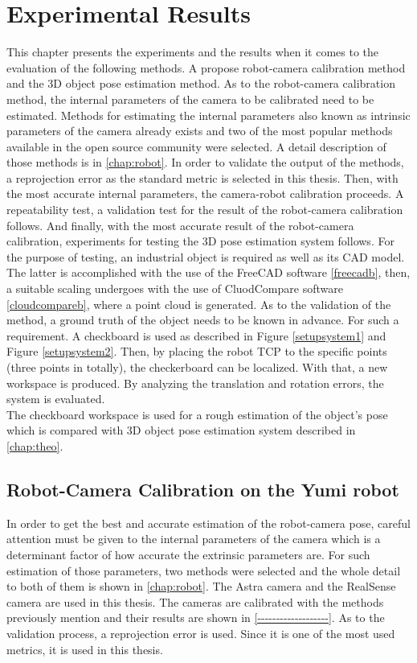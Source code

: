
\chapter{Experimental Results}
\label{chap:exp}

This chapter presents the experiments and the results when it comes to the evaluation of the following methods. A propose robot-camera calibration method and the 3D object pose estimation method. As to the robot-camera calibration method, the internal parameters of the camera to be calibrated need to be estimated. Methods for estimating the internal parameters also known as intrinsic parameters of the camera already exists and two of the most popular methods available in the open source community were selected. A detail description of those methods is in \ref{chap:robot}. In order to validate the output of the methods, a reprojection error as the standard metric is selected in this thesis. Then, with the most accurate internal parameters, the camera-robot calibration proceeds. A repeatability test, a validation test for the result of the robot-camera calibration follows. And finally, with the most accurate result of the robot-camera calibration, experiments for testing the 3D pose estimation system follows. For the purpose of testing, an industrial object is required as well as its CAD model. The latter is accomplished with the use of the FreeCAD software \ref{freecadb}, then, a suitable scaling undergoes with the use of CluodCompare software \ref{cloudcompareb}, where a point cloud is generated. As to the validation of the method, a ground truth of the object needs to be known in advance. For such a requirement. A checkboard is used as described in Figure \ref{setupsystem1} and Figure \ref{setupsystem2}. Then, by placing the robot TCP to the specific points (three points in totally), the checkerboard can be localized. With that, a new workspace is produced. By analyzing the translation and rotation errors, the system is evaluated.\\
The checkboard workspace is used for a rough estimation of the object's pose which is compared with 3D object pose estimation system described in \ref{chap:theo}.  


\section{Robot-Camera Calibration on the Yumi robot}
In order to get the best and accurate estimation of the robot-camera pose, careful attention must be given to the internal parameters of the camera which is a determinant factor of how accurate the extrinsic parameters are. For such estimation of those parameters, two methods were selected and the whole detail to both of them is shown in \ref{chap:robot}. The Astra camera and the RealSense camera are used in this thesis.  The cameras are calibrated with the methods previously mention and their results are shown in \ref{-------------------}. As to the validation process, a reprojection error is used. Since it is one of the most used metrics,  it is used in this thesis. 

